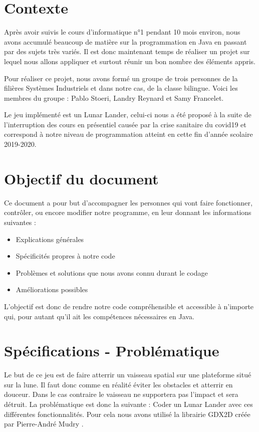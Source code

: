 \section{Contexte}
Après avoir suivis le cours d’informatique n°1 pendant 10 mois environ, nous avons accumulé beaucoup de matière sur la programmation en Java en passant par des sujets très variés. Il est donc maintenant temps de réaliser un projet sur lequel nous allons appliquer et surtout réunir un bon nombre des éléments appris.

Pour réaliser ce projet, nous avons formé un groupe de trois personnes de la filières Systèmes Industriels et dans notre cas, de la classe bilingue. Voici les membres du groupe : Pablo Stoeri, Landry Reynard et Samy Francelet.

Le jeu implémenté est un Lunar Lander, celui-ci nous a été proposé à la suite de l’interruption des cours en présentiel causée par la crise sanitaire du covid19 et correspond à notre niveau de programmation atteint en cette fin d’année scolaire 2019-2020.

\section{Objectif du document}
Ce document a pour but d’accompagner les personnes qui vont faire fonctionner, contrôler, ou encore modifier notre programme, en leur donnant les informations suivantes :
\begin{itemize}
\item	Explications générales
\item	Spécificités propres à notre code
\item	Problèmes et solutions que nous avons connu durant le codage
\item	Améliorations possibles
\end{itemize}
L’objectif est donc de rendre notre code compréhensible et accessible à n’importe qui, pour autant qu’il ait les compétences nécessaires en Java.


\section{Spécifications - Problématique}
Le but de ce jeu est de faire atterrir un vaisseau spatial sur une plateforme situé sur la lune. Il faut donc comme en réalité éviter les obstacles et atterrir en douceur. Dans le cas contraire le vaisseau ne supportera pas l’impact et sera détruit.
La problématique est donc la suivante : Coder un Lunar Lander avec ces différentes fonctionnalités.
Pour cela nous avons utilisé la librairie GDX2D créée par Pierre-André Mudry \cite{Inf1Begin}\cite{GDX2D}.

